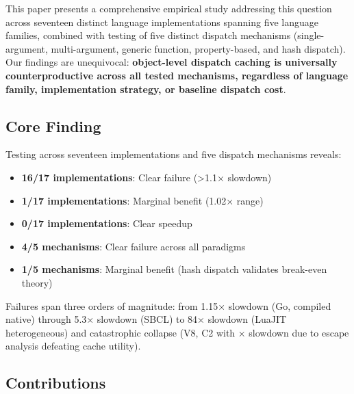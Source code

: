\documentclass[sigplan,final]{acmart}
\begin{document}
This paper presents a comprehensive empirical study addressing this question across seventeen
distinct language implementations spanning five language families, combined with testing of five
distinct dispatch mechanisms (single-argument, multi-argument, generic function, property-based, and
hash dispatch). Our findings are unequivocal: \textbf{object-level dispatch caching is universally
counterproductive across all tested mechanisms, regardless of language family, implementation
strategy, or baseline dispatch cost}.

\subsection{Core Finding}

Testing across seventeen implementations and five dispatch mechanisms reveals:
\begin{itemize}
  \item \textbf{16/17 implementations}: Clear failure (>1.1× slowdown)
  \item \textbf{1/17 implementations}: Marginal benefit (1.02× range)
  \item \textbf{0/17 implementations}: Clear speedup
  \item \textbf{4/5 mechanisms}: Clear failure across all paradigms
  \item \textbf{1/5 mechanisms}: Marginal benefit (hash dispatch validates break-even theory)
\end{itemize}

Failures span three orders of magnitude: from 1.15× slowdown (Go, compiled native) through 5.3× slowdown
(SBCL) to 84× slowdown (LuaJIT heterogeneous) and catastrophic collapse (V8, C2 with \infty× slowdown
due to escape analysis defeating cache utility).

\subsection{Contributions}
\end{document}
